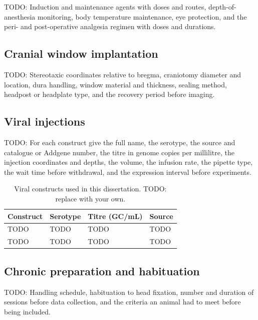 			TODO: Induction and maintenance agents with doses and routes,
			depth-of-anesthesia monitoring, body temperature maintenance, eye
			protection, and the peri- and post-operative analgesia regimen
			with doses and durations.

		\subsection{Cranial window implantation}

			TODO: Stereotaxic coordinates relative to bregma, craniotomy
			diameter and location, dura handling, window material and
			thickness, sealing method, headpost or headplate type, and the
			recovery period before imaging.

		\subsection{Viral injections}\label{section:methods:surgery:virus}

			TODO: For each construct give the full name, the serotype, the
			source and catalogue or Addgene number, the titre in genome copies
			per millilitre, the injection coordinates and depths, the volume,
			the infusion rate, the pipette type, the wait time before
			withdrawal, and the expression interval before experiments.

			\begin{table}[htbp]
				\centering
				\caption[Viral constructs]{
					Viral constructs used in this dissertation.
					TODO: replace with your own.
				}\label{table:methods:constructs}
				\begin{tabular}{llll}
					\toprule
					Construct & Serotype & Titre (GC/mL) & Source \\
					\midrule
					TODO & TODO & TODO & TODO \\
					TODO & TODO & TODO & TODO \\
					\bottomrule
				\end{tabular}
			\end{table}

		\subsection{Chronic preparation and habituation}

			TODO: Handling schedule, habituation to head fixation, number and
			duration of sessions before data collection, and the criteria an
			animal had to meet before being included.

